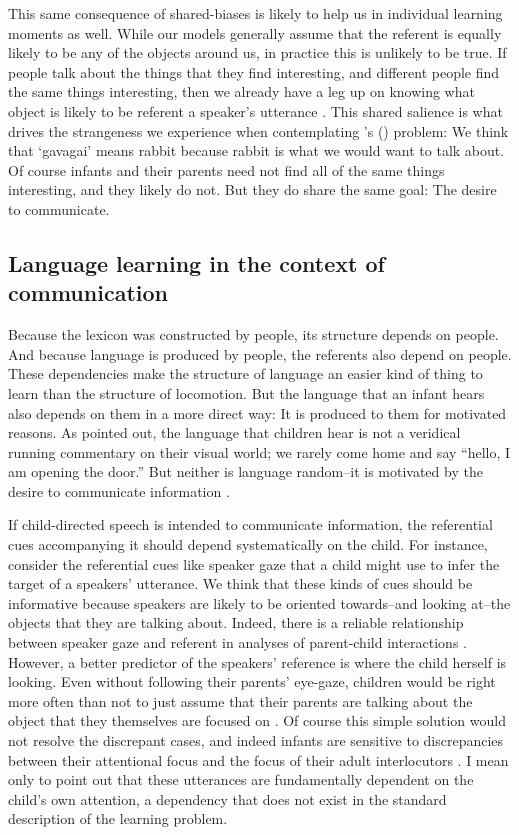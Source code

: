 \documentclass[review]{elsarticle}
\begin{document}
This same consequence of shared-biases is likely to help us in individual learning moments as well. While our models generally assume that the referent is equally likely to be any of the objects around us, in practice this is unlikely to be true. If people talk about the things that they find interesting, and different people find the same things interesting, then we already have a leg up on knowing what object is likely to be referent a speaker's utterance \citep{frank2012,frank2014}.  This shared salience is what drives the strangeness we experience when contemplating \citeauthor{quine1960}'s (\citeyear{quine1960}) problem: We think that `gavagai' means rabbit because rabbit is what we would want to talk about. Of course infants and their parents need not find all of the same things interesting, and they likely do not. But they do share the same goal: The desire to communicate.

\subsection{Language learning in the context of communication}

Because the lexicon was constructed by people, its structure depends on people. And because language is produced by people, the referents also depend on people. These dependencies make the structure of language an easier kind of thing to learn than the structure of locomotion. But the language that an infant hears also depends on them in a more direct way: It is produced to them for motivated reasons. As \cite{gleitman1990} pointed out, the language that children hear is not a veridical running commentary on their visual world; we rarely come home and say ``hello, I am opening the door.'' But neither is language random--it is motivated by the desire to communicate information \citep{grice1969}.

If child-directed speech is intended to communicate information, the referential cues accompanying it should depend systematically on the child. For instance, consider the referential cues like speaker gaze that a child might use to infer the target of a speakers' utterance. We think that these kinds of cues should be informative because speakers are likely to be oriented towards--and looking at--the objects that they are talking about. Indeed, there is a reliable relationship between speaker gaze and referent in analyses of parent-child interactions \citep{frank2013,yu2012embodied}. However, a better predictor of the speakers' reference is where the child herself is looking. Even without following their parents' eye-gaze, children would be right more often than not to just assume that their parents are talking about the object that they themselves are focused on \citep{tomasello1986}. Of course this simple solution would not resolve the discrepant cases, and indeed infants are sensitive to discrepancies between their attentional focus and the focus of their adult interlocutors \citep{baldwin1993}. I mean only to point out that these utterances are fundamentally dependent on the child's own attention, a dependency that does not exist in the standard description of the learning problem.
\end{document}
